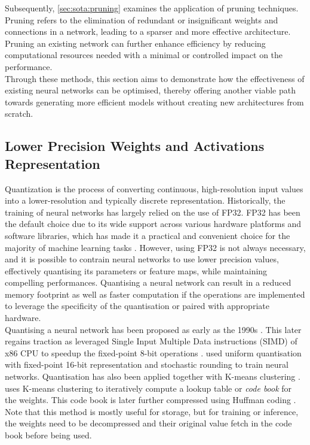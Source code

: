 Subsequently, \cref{sec:sota:pruning} examines the application of
pruning techniques. Pruning refers to the elimination of redundant or
insignificant weights and connections in a network, leading to a sparser and
more effective architecture. Pruning an existing network can further enhance
efficiency by reducing computational resources needed with a minimal or
controlled impact on the performance.\\

Through these methods, this section aims to demonstrate how the effectiveness of
existing neural networks can be optimised, thereby offering another viable path
towards generating more efficient models without creating new architectures from
scratch.\\

\subsection{Lower Precision Weights and Activations Representation}\label{sec:sota:quantisation}

Quantization is the process of converting continuous, high-resolution input
values into a lower-resolution and typically discrete representation.
Historically, the training of neural networks has largely relied on the use of
\ac{FP32}. FP32 has been the default choice due to its wide support across
various hardware platforms and software libraries, which has made it a practical
and convenient choice for the majority of machine learning tasks
\cite{sze2017efficient}. However, using \acl{FP32} is not always necessary, and
it is possible to contrain neural networks to use lower precision values,
effectively quantising its parameters or feature maps, while maintaining
compelling performances. Quantising a neural network can result in a reduced
memory footprint as well as faster computation if the operations are implemented
to leverage the specificity of the quantisation or paired with appropriate
hardware.\\

Quantising a neural network has been proposed as early as the 1990s
\cite{balzer1991weight,fiesler1990weight}. This later regains traction as
\citeauthor{37631} leveraged Single Input Multiple Data instructions (SIMD) of
x86 \ac{CPU} to speedup the fixed-point 8-bit operations \cite{37631}.
\citeauthor{gupta2015deep} used uniform quantisation with fixed-point 16-bit
representation and stochastic rounding to train neural networks. Quantisation
has also been applied together with K-means clustering
\cite{steinhaus1956division}. \cite{DBLP:journals/corr/HanMD15} uses K-means
clustering to iteratively compute a lookup table or \emph{code book} for the
weights. This code book is later further compressed using Huffman coding
\cite{huffman1952method}. Note that this method is mostly useful for storage,
but for training or inference, the weights need to be decompressed and their
original value fetch in the code book before being used.\\

